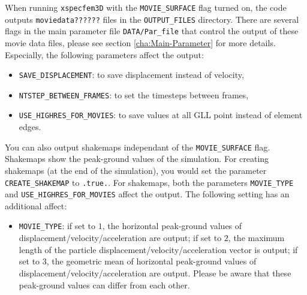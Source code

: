 When running \texttt{xspecfem3D} with the \texttt{MOVIE\_SURFACE}
flag turned on, the code outputs \texttt{moviedata??????} files in
the \texttt{OUTPUT\_FILES} directory. There are several flags in the
main parameter file \texttt{DATA/Par\_file} that control the output of
these movie data files, please see section \ref{cha:Main-Parameter} for
more details. Especially, the following parameters affect the output:
\begin{itemize}
\item \texttt{\small SAVE\_DISPLACEMENT}: to save displacement instead of velocity,
\item \texttt{\small NTSTEP\_BETWEEN\_FRAMES}: to set the timesteps between frames,
\item \texttt{\small USE\_HIGHRES\_FOR\_MOVIES}: to save values at all GLL point instead of element edges.
\end{itemize}

You can also output shakemaps independant of the \texttt{MOVIE\_SURFACE} flag. Shakemaps show the peak-ground values of the simulation. For creating shakemaps (at the end of the simulation), you would set the parameter
\texttt{\small CREATE\_SHAKEMAP} to \texttt{\small .true.}.
For shakemaps, both the parameters \texttt{\small MOVIE\_TYPE} and \texttt{\small USE\_HIGHRES\_FOR\_MOVIES} affect the output. The following setting has an additional affect:
\begin{itemize}
\item \texttt{\small MOVIE\_TYPE}: if set to $1$, the horizontal peak-ground values of displacement/velocity/acceleration are output; if set to $2$, the maximum length of the particle displacement/velocity/acceleration vector is output; if set to $3$, the geometric mean of horizontal peak-ground values of displacement/velocity/acceleration are output. Please be aware that these peak-ground values can differ from each other.
\end{itemize}

